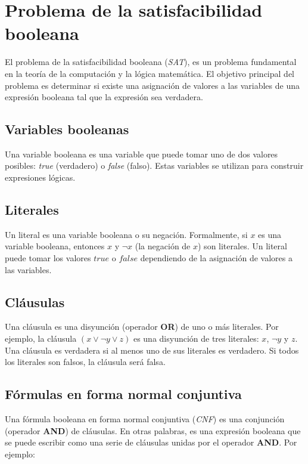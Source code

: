 \documentclass{article}
\begin{document}
\section{Problema de la satisfacibilidad booleana}

El problema de la satisfacibilidad booleana (\textit{SAT}), es un problema fundamental en la teoría de la computación y la lógica matemática. El objetivo principal del problema es determinar si existe una asignación de valores a las variables de una expresión booleana tal que la expresión sea verdadera.

\subsection{Variables booleanas}

Una variable booleana es una variable que puede tomar uno de dos valores posibles: \textit{true} (verdadero) o \textit{false} (falso). Estas variables se utilizan para construir expresiones lógicas.

\subsection{Literales}

Un literal es una variable booleana o su negación. Formalmente, si \( x \) es una variable booleana, entonces \( x \) y \( \neg x \) (la negación de \( x \)) son literales. Un literal puede tomar los valores \( true \) o \( false \) dependiendo de la asignación de valores a las variables.

\subsection{Cláusulas}

Una cláusula es una disyunción (operador \textbf{OR}) de uno o más literales. Por ejemplo, la cláusula \( (x \vee \neg y \vee z) \) es una disyunción de tres literales: \( x \), \( \neg y \) y \( z \). Una cláusula es verdadera si al menos uno de sus literales es verdadero. Si todos los literales son falsos, la cláusula será falsa.

\subsection{Fórmulas en forma normal conjuntiva}

Una fórmula booleana en forma normal conjuntiva (\textit{CNF}) es una conjunción (operador \textbf{AND}) de cláusulas. En otras palabras, es una expresión booleana que se puede escribir como una serie de cláusulas unidas por el operador \textbf{AND}. Por ejemplo:
\end{document}
